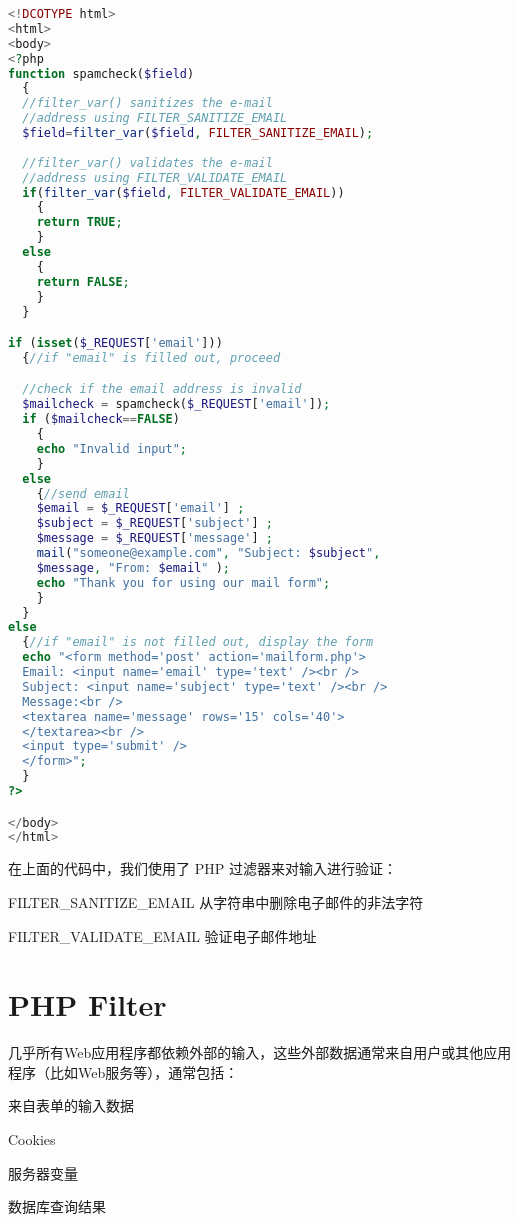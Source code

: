 \begin{lstlisting}[language=PHP]
<!DCOTYPE html>
<html>
<body>
<?php
function spamcheck($field)
  {
  //filter_var() sanitizes the e-mail 
  //address using FILTER_SANITIZE_EMAIL
  $field=filter_var($field, FILTER_SANITIZE_EMAIL);
  
  //filter_var() validates the e-mail
  //address using FILTER_VALIDATE_EMAIL
  if(filter_var($field, FILTER_VALIDATE_EMAIL))
    {
    return TRUE;
    }
  else
    {
    return FALSE;
    }
  }

if (isset($_REQUEST['email']))
  {//if "email" is filled out, proceed

  //check if the email address is invalid
  $mailcheck = spamcheck($_REQUEST['email']);
  if ($mailcheck==FALSE)
    {
    echo "Invalid input";
    }
  else
    {//send email
    $email = $_REQUEST['email'] ; 
    $subject = $_REQUEST['subject'] ;
    $message = $_REQUEST['message'] ;
    mail("someone@example.com", "Subject: $subject",
    $message, "From: $email" );
    echo "Thank you for using our mail form";
    }
  }
else
  {//if "email" is not filled out, display the form
  echo "<form method='post' action='mailform.php'>
  Email: <input name='email' type='text' /><br />
  Subject: <input name='subject' type='text' /><br />
  Message:<br />
  <textarea name='message' rows='15' cols='40'>
  </textarea><br />
  <input type='submit' />
  </form>";
  }
?>

</body>
</html>
\end{lstlisting}

在上面的代码中，我们使用了 PHP 过滤器来对输入进行验证：

\begin{compactitem}
\item FILTER\_SANITIZE\_EMAIL 从字符串中删除电子邮件的非法字符
\item FILTER\_VALIDATE\_EMAIL 验证电子邮件地址
\end{compactitem}





\chapter{PHP Filter}



几乎所有Web应用程序都依赖外部的输入，这些外部数据通常来自用户或其他应用程序（比如Web服务等），通常包括：

\begin{compactitem}
\item 来自表单的输入数据
\item Cookies
\item 服务器变量
\item 数据库查询结果
\end{compactitem}








